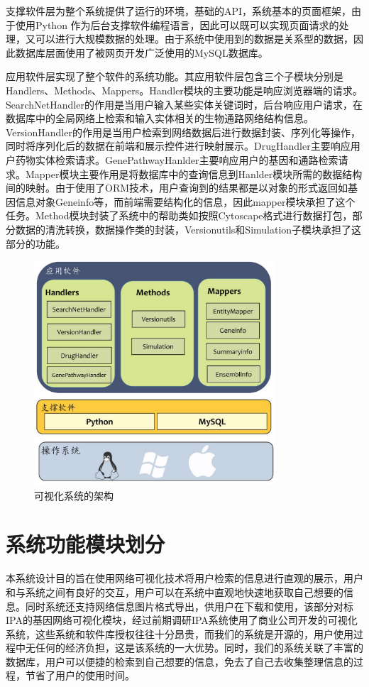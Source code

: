支撑软件层为整个系统提供了运行的环境，基础的API，系统基本的页面框架，由于使用Python 作为后台支撑软件编程语言，因此可以既可以实现页面请求的处理，又可以进行大规模数据的处理。由于系统中使用到的数据是关系型的数据，因此数据库层面使用了被网页开发广泛使用的MySQL数据库。

应用软件层实现了整个软件的系统功能。其应用软件层包含三个子模块分别是Handlers、Methods、Mappers。Handler模块的主要功能是响应浏览器端的请求。SearchNetHandler的作用是当用户输入某些实体关键词时，后台响应用户请求，在数据库中的全局网络上检索和输入实体相关的生物通路网络结构信息。VersionHandler的作用是当用户检索到网络数据后进行数据封装、序列化等操作，同时将序列化后的数据在前端和展示控件进行映射展示。DrugHandler主要响应用户药物实体检索请求。GenePathwayHanlder主要响应用户的基因和通路检索请求。Mapper模块主要作用是将数据库中的查询信息到Hanlder模块所需的数据结构间的映射。由于使用了ORM技术，用户查询到的结果都是以对象的形式返回如基因信息对象Geneinfo等，而前端需要结构化的信息，因此mapper模块承担了这个任务。Method模块封装了系统中的帮助类如按照Cytoscape格式进行数据打包，部分数据的清洗转换，数据操作类的封装，Versionutils和Simulation子模块承担了这部分的功能。
\begin{figure}[h]
\centering
\includegraphics[width = 0.8\textwidth]{framework}
\caption[fig31]{可视化系统的架构}
\label{fig31}
\end{figure}

\section{系统功能模块划分}
本系统设计目的旨在使用网络可视化技术将用户检索的信息进行直观的展示，用户和与系统之间有良好的交互，用户可以在系统中直观地快速地获取自己想要的信息。同时系统还支持网络信息图片格式导出，供用户在下载和使用，该部分对标IPA的基因网络可视化模块，经过前期调研IPA系统使用了商业公司开发的可视化系统，这些系统和软件库授权往往十分昂贵，而我们的系统是开源的，用户使用过程中无任何的经济负担，这是该系统的一大优势。同时，我们的系统关联了丰富的数据库，用户可以便捷的检索到自己想要的信息，免去了自己去收集整理信息的过程，节省了用户的使用时间。

